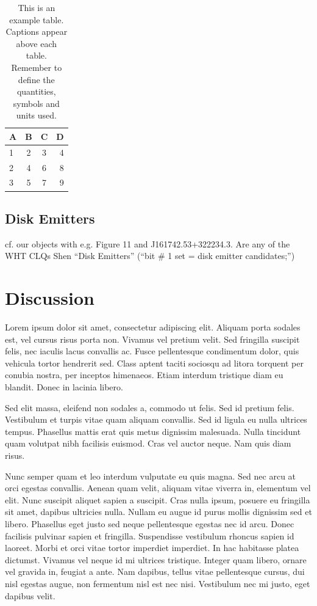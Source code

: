 \documentclass[a4paper,fleqn,usenatbib]{mnras}
\begin{document}
\begin{table}
	\centering
	\caption{This is an example table. Captions appear above each table.
	Remember to define the quantities, symbols and units used.}
	\label{tab:example_table}
	\begin{tabular}{lccr} %
		\hline
		A & B & C & D\\
		\hline
		1 & 2 & 3 & 4\\
		2 & 4 & 6 & 8\\
		3 & 5 & 7 & 9\\
		\hline
	\end{tabular}
\end{table}

\subsection{Disk Emitters} 
cf. our objects with e.g. Figure 11 \citet{Shen2011} and J161742.53+322234.3. 
Are any of the WHT CLQs Shen ``Disk Emitters''  
(``bit \# 1 set = disk emitter candidates;'')


\section{Discussion}\label{sec:discussion} 
Lorem ipsum dolor sit amet, consectetur adipiscing elit. Aliquam porta sodales est, vel cursus risus porta non. Vivamus vel pretium velit. Sed fringilla suscipit felis, nec iaculis lacus convallis ac. Fusce pellentesque condimentum dolor, quis vehicula tortor hendrerit sed. Class aptent taciti sociosqu ad litora torquent per conubia nostra, per inceptos himenaeos. Etiam interdum tristique diam eu blandit. Donec in lacinia libero.

Sed elit massa, eleifend non sodales a, commodo ut felis. Sed id pretium felis. Vestibulum et turpis vitae quam aliquam convallis. Sed id ligula eu nulla ultrices tempus. Phasellus mattis erat quis metus dignissim malesuada. Nulla tincidunt quam volutpat nibh facilisis euismod. Cras vel auctor neque. Nam quis diam risus.

Nunc semper quam et leo interdum vulputate eu quis magna. Sed nec arcu at orci egestas convallis. Aenean quam velit, aliquam vitae viverra in, elementum vel elit. Nunc suscipit aliquet sapien a suscipit. Cras nulla ipsum, posuere eu fringilla sit amet, dapibus ultricies nulla. Nullam eu augue id purus mollis dignissim sed et libero. Phasellus eget justo sed neque pellentesque egestas nec id arcu. Donec facilisis pulvinar sapien et fringilla. Suspendisse vestibulum rhoncus sapien id laoreet. Morbi et orci vitae tortor imperdiet imperdiet. In hac habitasse platea dictumst. Vivamus vel neque id mi ultrices tristique. Integer quam libero, ornare vel gravida in, feugiat a ante. Nam dapibus, tellus vitae pellentesque cursus, dui nisl egestas augue, non fermentum nisl est nec nisi. Vestibulum nec mi justo, eget dapibus velit.
\end{document}
